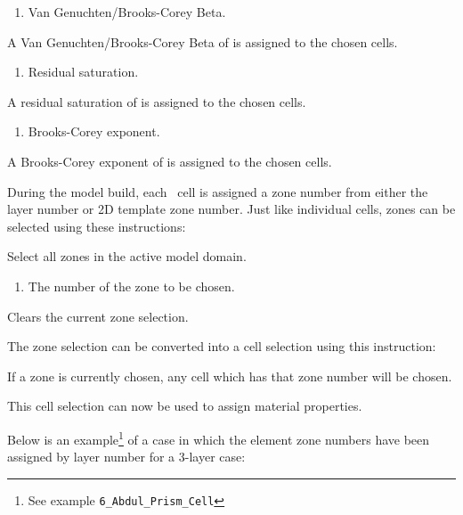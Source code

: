 {
    {
        \squish
        \begin{enumerate}
        \item {}  Van Genuchten/Brooks-Corey Beta.
        \end{enumerate}
          A Van Genuchten/Brooks-Corey Beta of  is assigned to the chosen cells.
    }

    {
        \squish
        \begin{enumerate}
        \item {}  Residual saturation.
        \end{enumerate}
          A residual saturation of  is assigned to the chosen cells.
    }

    {
        \squish
        \begin{enumerate}
        \item {}  Brooks-Corey exponent.
        \end{enumerate}
          A Brooks-Corey exponent of  is assigned to the chosen cells.
    }

During the model build, each \gwf\ cell is assigned a zone number from either the layer number or 2D template zone number. Just like individual cells, zones can be selected using these instructions\label{page:zoneSelect}:

    {Select all zones in the active model domain.
     }

    {
        \squish
        \begin{enumerate}
        \item {}  The number of the zone to be chosen.
        \end{enumerate}
        \squish
    }

    {Clears the current zone selection.
     }

The zone selection can be converted into a cell selection using this instruction:

    {If a zone is currently chosen, any cell which has that zone number will be chosen.
     }

This cell selection can now be used to assign material properties.

Below is an example\footnote{See example \texttt{6\_Abdul\_Prism\_Cell}} of a case in which the element zone numbers have been assigned by layer number for a 3-layer case:

}
